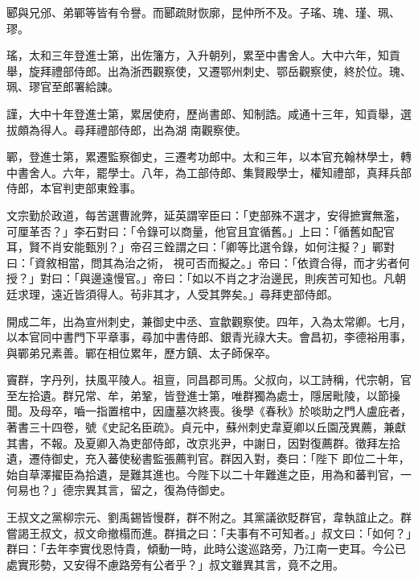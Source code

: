 \begin{pinyinscope}
 郾與兄邠、弟鄲等皆有令譽。而郾疏財恢廓，昆仲所不及。子瑤、瑰、瑾、珮、璆。



 瑤，太和三年登進士第，出佐籓方，入升朝列，累至中書舍人。大中六年，知貢舉，旋拜禮部侍郎。出為浙西觀察使，又遷鄂州刺史、鄂岳觀察使，終於位。瑰、珮、璆官至郎署給諫。



 謹，大中十年登進士第，累居使府，歷尚書郎、知制誥。咸通十三年，知貢舉，選拔頗為得人。尋拜禮部侍郎，出為湖
 南觀察使。



 鄲，登進士第，累遷監察御史，三遷考功郎中。太和三年，以本官充翰林學士，轉中書舍人。六年，罷學士。八年，為工部侍郎、集賢殿學士，權知禮部，真拜兵部侍郎，本官判吏部東銓事。



 文宗勤於政道，每苦選曹訛弊，延英謂宰臣曰：「吏部殊不選才，安得摭實無濫，可厘革否？」李石對曰：「令錄可以商量，他官且宜循舊。」上曰：「循舊如配官耳，賢不肖安能甄別？」帝召三銓謂之曰：「卿等比選令錄，如何注擬？」鄲對曰：「資敘相當，問其為治之術，
 視可否而擬之。」帝曰：「依資合得，而才劣者何授？」對曰：「與邊遠慢官。」帝曰：「如以不肖之才治邊民，則疾苦可知也。凡朝廷求理，遠近皆須得人。茍非其才，人受其弊矣。」尋拜吏部侍郎。



 開成二年，出為宣州刺史，兼御史中丞、宣歙觀察使。四年，入為太常卿。七月，以本官同中書門下平章事，尋加中書侍郎、銀青光祿大夫。會昌初，李德裕用事，與鄲弟兄素善。鄲在相位累年，歷方鎮、太子師保卒。



 竇群，字丹列，扶風平陵人。祖亶，同昌郡司馬。父叔向，以工詩稱，代宗朝，官至左拾遺。群兄常、牟，弟鞏，皆登進士第，唯群獨為處士，隱居毗陵，以節操聞。及母卒，嚙一指置棺中，因廬墓次終喪。後學《春秋》於啖助之門人盧庇者，著書三十四卷，號《史記名臣疏》。貞元中，蘇州刺史韋夏卿以丘園茂異薦，兼獻其書，不報。及夏卿入為吏部侍郎，改京兆尹，中謝日，因對復薦群。徵拜左拾遺，遷侍御史，充入蕃使秘書監張薦判官。群因入對，奏曰：「陛下
 即位二十年，始自草澤擢臣為拾遺，是難其進也。今陛下以二十年難進之臣，用為和蕃判官，一何易也？」德宗異其言，留之，復為侍御史。



 王叔文之黨柳宗元、劉禹錫皆慢群，群不附之。其黨議欲貶群官，韋執誼止之。群嘗謁王叔文，叔文命撤榻而進。群揖之曰：「夫事有不可知者。」叔文曰：「如何？」群曰：「去年李實伐恩恃貴，傾動一時，此時公逡巡路旁，乃江南一吏耳。今公已處實形勢，又安得不慮路旁有公者乎？」叔文雖異其言，竟不之用。




\end{pinyinscope}
